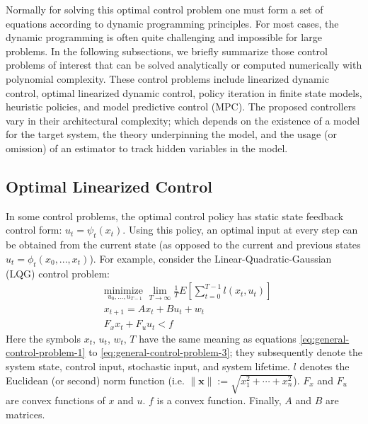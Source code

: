 Normally for solving this optimal control problem one must form a set of equations according to dynamic programming principles. For most cases, the dynamic programming is often quite challenging and impossible for large problems. 
In the following subsections, we briefly summarize those control problems of interest that can be solved analytically or computed numerically with polynomial complexity. These control problems include linearized dynamic control, optimal linearized dynamic control, policy iteration in finite state models, heuristic policies, and model predictive control (MPC).   
 The proposed controllers vary in their architectural complexity; which depends on the existence of a model for the target system, the theory underpinning the model, and the usage (or omission) of an estimator to track hidden variables in the model. 

\subsection{Optimal Linearized Control}
\label{sec:optimal-linearized-control}       
In some control problems, the optimal control policy has static state feedback control form: $u_t=\psi_t(x_t)$. Using this policy, an optimal input at every step can be obtained from the current state (as opposed to the current and previous states $u_t=\phi_t(x_0,...,x_t)$). 
 For example, consider the Linear-Quadratic-Gaussian (LQG) control problem:
 \begin{align}
   & \underset{u_0,...,u_{T-1}} {\text{minimize  } }   \lim_{T\to\infty}  \frac{1}{T} E\left[\sum_{t=0}^{T-1} l(x_t,u_t)\right]   \label{eq:linear-control-problem-1} \\  
   & x_{t+1}=Ax_t+Bu_t+w_t \label{eq:linear-control-problem-2} \\ 
   &  F_x x_t + F_u u_t < f  \label{eq:linear-control-problem-3}      
  \end{align} 
   Here the symbols  $x_t$, $u_t$, $w_t$, $T$  have the same meaning as equations  \ref{eq:general-control-problem-1}  to \ref{eq:general-control-problem-3}; they subsequently denote the system state, control input, stochastic input, and system lifetime. 
   $l$ denotes the Euclidean (or second) norm function (i.e. $\|\boldsymbol{x}\| := \sqrt{x_1^2 + \cdots + x_n^2}$). 
$F_x$  and $F_u$ are convex functions of $x$ and $u$.
$f$  is a convex function.
Finally, $A$ and $B$ are matrices.  

